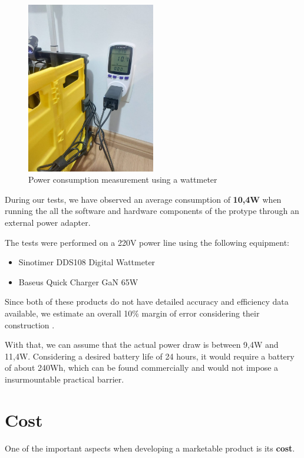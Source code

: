 \documentclass[openright]{normas-utf-tex} %
\begin{document}
\begin{figure}[H]
	\centering
	\includegraphics[width=0.5\textwidth]{./images/powerconsumption.jpeg}
	\caption[Power consumption measurement using a wattmeter]{Power consumption measurement using a wattmeter}
\end{figure}

During our tests, we have observed an average consumption of \textbf{10,4W}
when running the all the software and hardware components of the protype
through an external power adapter. 

The tests were performed on a 220V power line using the following equipment:
\begin{itemize}
    \item Sinotimer DDS108 Digital Wattmeter
    \item Baseus Quick Charger GaN 65W
\end{itemize}

Since both of these products do not have detailed accuracy and efficiency data
available, we estimate an overall 10\% margin of error considering their
construction \cite{Chen2017}. 

With that, we can assume that the actual power draw is between 9,4W and 11,4W.
Considering a desired  battery life of 24 hours, it would require a battery of
about 240Wh, which can be found commercially and would not impose a
insurmountable practical barrier.

\section{Cost}

One of the important aspects when developing a marketable product is its \textbf{cost}.
\end{document}
